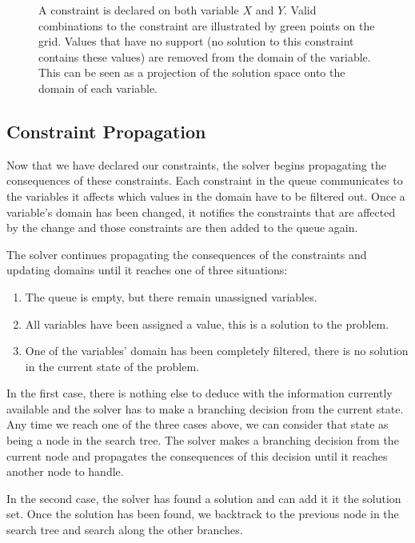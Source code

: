 \documentclass[../Document.tex]{subfiles}
\begin{document}
\begin{figure}[ht]
    \centering
    
    \caption[Domain filtering on one variable.]{A constraint is declared on both variable $X$ and $Y$. Valid combinations to the constraint are illustrated by green points on the grid. Values that have no support (no solution to this constraint contains these values) are removed from the domain of the variable. This can be seen as a projection of the solution space onto the domain of each variable.}
    \label{fig:domain_filtering}
\end{figure} 

\subsection{Constraint Propagation}
Now that we have declared our constraints, the solver begins propagating the consequences of these constraints. Each constraint in the queue communicates to the variables it affects which values in the domain have to be filtered out. Once a variable's domain has been changed, it notifies the constraints that are affected by the change and those constraints are then added to the queue again.

The solver continues propagating the consequences of the constraints and updating domains until it reaches one of three situations: 
\begin{enumerate}
    \item The queue is empty, but there remain unassigned variables.
    \item All variables have been assigned a value, this is a solution to the problem.
    \item One of the variables' domain has been completely filtered, there is no solution in the current state of the problem.
\end{enumerate}

In the first case, there is nothing else to deduce with the information currently available and the solver has to make a branching decision from the current state. Any time we reach one of the three cases above, we can consider that state as being a node in the search tree. The solver makes a branching decision from the current node and propagates the consequences of this decision until it reaches another node to handle.

In the second case, the solver has found a solution and can add it it the solution set. Once the solution has been found, we backtrack to the previous node in the search tree and search along the other branches.
\end{document}
